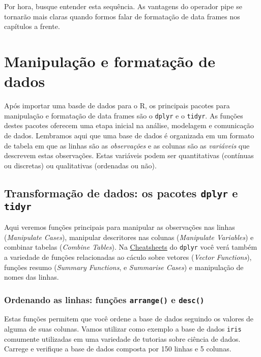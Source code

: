 \documentclass[
]{book}
\begin{document}
Por hora, busque entender esta sequência. As vantagens do operador pipe se tornarão mais claras quando formos falar de formatação de data frames nos capítulos a frente.

\hypertarget{format}{%
\chapter{Manipulação e formatação de dados}\label{format}}

Após importar uma basde de dados para o R, os principais pacotes para manipulação e formatação de data frames são o \texttt{dplyr} e o \texttt{tidyr}. As funções destes pacotes oferecem uma etapa inicial na análise, modelagem e comunicação de dados. Lembramos aqui que uma base de dados é organizada em um formato de tabela em que as linhas são as \emph{observações} e as colunas são as \emph{variáveis} que descrevem estas observações. Estas variáveis podem ser quantitativas (contínuas ou discretas) ou qualitativas (ordenadas ou não).

\hypertarget{transformauxe7uxe3o-de-dados-os-pacotes-dplyr-e-tidyr}{%
\section{\texorpdfstring{Transformação de dados: os pacotes \texttt{dplyr} e \texttt{tidyr}}{Transformação de dados: os pacotes dplyr e tidyr}}\label{transformauxe7uxe3o-de-dados-os-pacotes-dplyr-e-tidyr}}

Aqui veremos funções principais para manipular as observações nas linhas (\emph{Manipulate Cases}), manipular descritores nas colunas (\emph{Manipulate Variables}) e combinar tabelas (\emph{Combine Tables}). Na \href{https://rstudio.com/resources/cheatsheets/}{Cheatsheets} do \texttt{dplyr} você verá também a variedade de funções relacionadas ao cáculo sobre vetores (\emph{Vector Functions}), funções resumo (\emph{Summary Functions}, e \emph{Summarise Cases}) e manipulação de nomes das linhas.

\hypertarget{ordenando-as-linhas-funuxe7uxf5es-arrange-e-desc}{%
\subsection{\texorpdfstring{Ordenando as linhas: funções \texttt{arrange()} e \texttt{desc()}}{Ordenando as linhas: funções arrange() e desc()}}\label{ordenando-as-linhas-funuxe7uxf5es-arrange-e-desc}}

Estas funções permitem que você ordene a base de dados seguindo os valores de alguma de suas colunas. Vamos utilizar como exemplo a base de dados \texttt{iris} comumente utilizadas em uma variedade de tutorias sobre ciência de dados. Carrege e verifique a base de dados composta por 150 linhas e 5 colunas.
\end{document}
